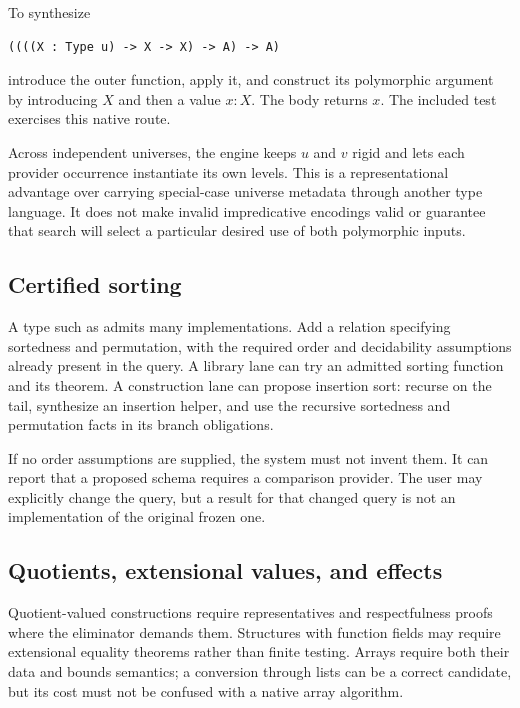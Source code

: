 To synthesize
\par\noindent\begin{minipage}{\linewidth}
\begin{lstlisting}
((((X : Type u) -> X -> X) -> A) -> A)
\end{lstlisting}
\end{minipage}\par
introduce the outer function, apply it, and construct its polymorphic argument by introducing $X$ and then a value $x:X$. The body returns $x$. The included  test exercises this native route.

Across independent universes, the engine keeps $u$ and $v$ rigid and lets each provider occurrence instantiate its own levels. This is a representational advantage over carrying special-case universe metadata through another type language. It does not make invalid impredicative encodings valid or guarantee that search will select a particular desired use of both polymorphic inputs.

\subsection{Certified sorting}

A type such as  admits many implementations. Add a relation specifying sortedness and permutation, with the required order and decidability assumptions already present in the query. A library lane can try an admitted sorting function and its theorem. A construction lane can propose insertion sort: recurse on the tail, synthesize an insertion helper, and use the recursive sortedness and permutation facts in its branch obligations.

If no order assumptions are supplied, the system must not invent them. It can report that a proposed schema requires a comparison provider. The user may explicitly change the query, but a result for that changed query is not an implementation of the original frozen one.

\subsection{Quotients, extensional values, and effects}

Quotient-valued constructions require representatives and respectfulness proofs where the eliminator demands them. Structures with function fields may require extensional equality theorems rather than finite testing. Arrays require both their data and bounds semantics; a conversion through lists can be a correct candidate, but its cost must not be confused with a native array algorithm.

